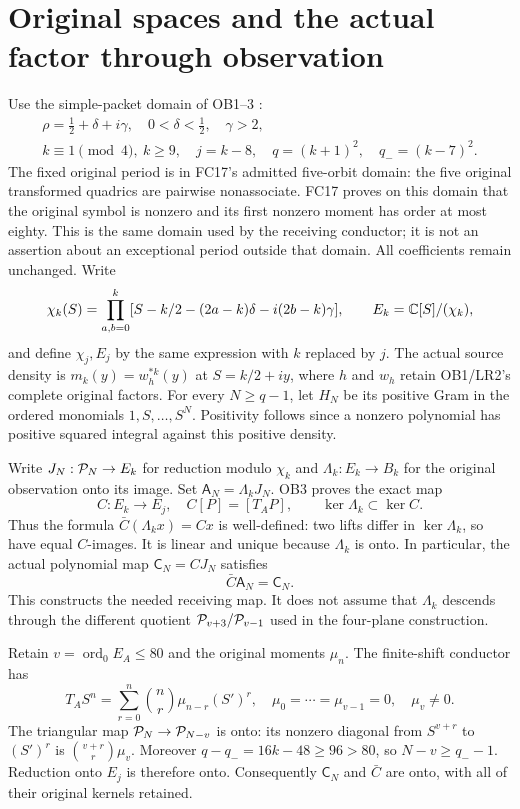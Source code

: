 \documentclass[11pt]{article}
\begin{document}
\section{Original spaces and the actual factor through observation}
Use the simple-packet domain of OB1--3 \cite{eightmin:OB}:
\[
 \begin{gathered}
 \rho=\tfrac12+\delta+i\gamma,\quad0<\delta<\tfrac12,\quad\gamma>2,\\
 k\equiv1\pmod4,\ k\ge9,\quad j=k-8,\quad
 q=(k+1)^2,\quad q_-=(k-7)^2.
 \end{gathered}
\]
The fixed original period is in FC17's admitted five-orbit domain:
the five original transformed quadrics are pairwise nonassociate.
FC17 proves on this domain that the original symbol is nonzero and
its first nonzero moment has order at most eighty. This is the same
domain used by the receiving conductor; it is not an assertion about
an exceptional period outside that domain. All coefficients remain
unchanged. Write
\[
 \chi_k(S)=\prod_{a,b=0}^k
 [S-k/2-(2a-k)\delta-i(2b-k)\gamma],\qquad
 E_k=\mathbb C[S]/(\chi_k),
\]
and define $\chi_j,E_j$ by the same expression with $k$ replaced by $j$.
The actual source density is $m_k(y)=w_h^{*k}(y)$ at $S=k/2+iy$,
where $h$ and $w_h$ retain OB1/LR2's complete original factors.
For every $N\ge q-1$, let $H_N$ be its positive Gram in the ordered
monomials $1,S,\ldots,S^N$. Positivity follows since a nonzero
polynomial has positive squared integral against this positive density.

Write $J_N:\mathcal P_N\to E_k$ for reduction modulo $\chi_k$ and
$\Lambda_k:E_k\to B_k$ for the original observation onto its image.
Set $\mathsf A_N=\Lambda_kJ_N$. OB3 proves the exact map
\[
 C:E_k\longrightarrow E_j,\quad C[P]=[T_AP],\qquad
 \ker\Lambda_k\subset\ker C.                                      \tag{EQ1}
\]
Thus the formula $\bar C(\Lambda_kx)=Cx$ is well-defined: two lifts
differ in $\ker\Lambda_k$, so have equal $C$-images. It is linear
and unique because $\Lambda_k$ is onto. In particular, the actual
polynomial map $\mathsf C_N=CJ_N$ satisfies
\[
 \bar C\mathsf A_N=\mathsf C_N.                                    \tag{EQ2}
\]
This constructs the needed receiving map. It does not assume that
$\Lambda_k$ descends through the different quotient
$\mathcal P_{v+3}/\mathcal P_{v-1}$ used in the four-plane construction.

Retain $v=\operatorname{ord}_0E_A\le80$ and the original moments
$\mu_n$. The finite-shift conductor has
\[
 T_A S^n=\sum_{r=0}^n\binom nr\mu_{n-r}(S')^r,
 \quad\mu_0=\cdots=\mu_{v-1}=0,\quad\mu_v\ne0.                    \tag{EQ3}
\]
The triangular map $\mathcal P_N\to\mathcal P_{N-v}$ is onto: its nonzero
diagonal from $S^{v+r}$ to $(S')^r$ is
$\binom{v+r}{r}\mu_v$. Moreover
$q-q_-=16k-48\ge96>80$, so $N-v\ge q_--1$.
Reduction onto $E_j$ is therefore onto. Consequently $\mathsf C_N$
and $\bar C$ are onto, with all of their original kernels retained.
\end{document}
